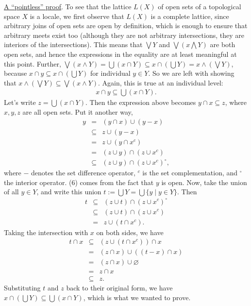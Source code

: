 \documentclass[12pt]{article}
\begin{document}
\underline{A ``pointless'' proof}.  To see that the lattice $L(X)$ of open sets of a topological space $X$ is a locale, we first observe that $L(X)$ is a complete lattice, since arbitrary joins of open sets are open by definition, which is enough to ensure that arbitrary meets exist too (although they are not arbitrary intersections, they are interiors of the intersections).  This means that $\bigvee Y$  and $\bigvee (x\bigwedge Y)$ are both open sets, and hence the expressions in the equality are at least meaningful at this point.  Further, $\bigvee (x\wedge Y)=\bigcup (x\cap Y)\subseteq x\cap (\bigcup Y)=x\wedge (\bigvee Y)$, because $x\cap y\subseteq x\cap (\bigcup Y)$ for individual $y\in Y$.  So we are left with showing that $x\wedge (\bigvee Y)\subseteq \bigvee (x\wedge Y)$.  Again, this is true at an individual level: 
\begin{eqnarray}
x\cap y\subseteq \bigcup (x\cap Y).
\end{eqnarray}
Let's write $z=\bigcup (x\cap Y)$.  Then the expression above becomes $y\cap x\subseteq z$, where $x,y,z$ are all open sets.  Put it another way, 
\begin{eqnarray}
y &=&(y\cap x)\cup (y-x) \\ 
&\subseteq& z\cup (y-x) \\
&=& z\cup (y\cap x^c) \\
&=& (z\cup y)\cap (z\cup x^c) \\
&\subseteq& (z\cup y)\cap (z\cup x^c)^{\circ}, 
\end{eqnarray}
where $-$ denotes the set difference operator, $^c$ is the set complementation, and $^\circ$ the interior operator.  (6) comes from the fact that $y$ is open.  Now, take the union of all $y\in Y$, and write this union $t:=\bigcup Y=\bigcup \lbrace y\mid y\in Y\rbrace$.  Then 
\begin{eqnarray}
t &\subseteq& (z\cup t)\cap (z\cup x^c)^{\circ} \\
&\subseteq& (z\cup t)\cap (z\cup x^c) \\
&=& z\cup (t\cap x^c).
\end{eqnarray}
Taking the intersection with $x$ on both sides, we have
\begin{eqnarray}
t\cap x &\subseteq& (z\cup (t\cap x^c))\cap x \\
&=& (z\cap x)\cup ((t-x)\cap x) \\
&=& (z\cap x)\cup \varnothing \\
&=& z\cap x \\
&\subseteq& z.
\end{eqnarray}
Substituting $t$ and $z$ back to their original form, we have $x\cap (\bigcup Y)\subseteq \bigcup (x\cap Y)$, which is what we wanted to prove.
\end{document}
